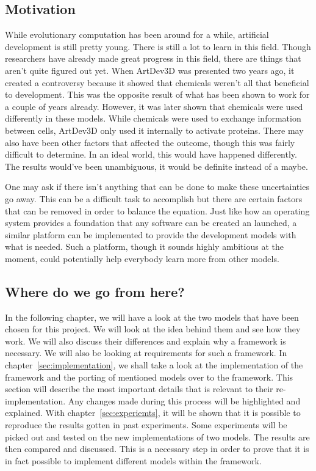 \subsection{Motivation}
While evolutionary computation has been around for a while, artificial development is still pretty young. There is still a lot to learn in this field. Though researchers have already made great progress in this field, there are things that aren't quite figured out yet. When ArtDev3D was presented two years ago, it created a controversy because it showed that chemicals weren't all that beneficial to development. This was the opposite result of what has been shown to work for a couple of years already. However, it was later shown that chemicals were used differently in these models. While chemicals were used to exchange information between cells, ArtDev3D only used it internally to activate proteins. There may also have been other factors that affected the outcome, though this was fairly difficult to determine. In an ideal world, this would have happened differently. The results would've been unambiguous, it would be definite instead of a maybe.

One may ask if there isn't anything that can be done to make these uncertainties go away. This can be a difficult task to accomplish but there are certain factors that can be removed in order to balance the equation. Just like how an operating system provides a foundation that any software can be created an launched, a similar platform can be implemented to provide the development models with what is needed. Such a platform, though it sounds highly ambitious at the moment, could potentially help everybody learn more from other models.

\subsection{Where do we go from here?}
In the following chapter, we will have a look at the two models that have been chosen for this project. We will look at the idea behind them and see how they work. We will also discuss their differences and explain why a framework is necessary. We will also be looking at requirements for such a framework. In chapter~\ref{sec:implementation}, we shall take a look at the implementation of the framework and the porting of mentioned models over to the framework. This section will describe the most important details that is relevant to their re-implementation. Any changes made during this process will be highlighted and explained. With chapter~\ref{sec:experiemts}, it will be shown that it is possible to reproduce the results gotten in past experiments. Some experiments will be picked out and tested on the new implementations of two models. The results are then compared and discussed. This is a necessary step in order to prove that it is in fact possible to implement different models within the framework.
